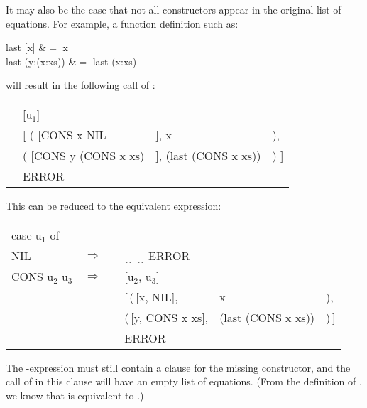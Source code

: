 It may also be the case that not all constructors appear in the original list of equations. For example, a function definition such as:
\begin{letalign}
        last [x] &$=$ x \\
        last (y:(x:xs)) &$=$ last (x:xs)
\end{letalign}
will result in the following call of :
\begin{mlcoded}
    \setlength{\tabcolsep}{0.25em}
    \begin{tabular}{llll}
        \metafn{match} &[u$_1$]  && \\
        &[ ( [CONS x NIL&], x &), \\
        &\phantom{[ }( [CONS y (CONS x xs)&], (last (CONS x xs)) &) ] \\
        &ERROR
    \end{tabular}
\end{mlcoded}
This can be reduced to the equivalent expression:
\begin{mlcoded}
    \setlength{\tabcolsep}{0.25em}
    \begin{tabular}{llllll}
        case u$_1$ of &&&&& \\
        \quad NIL &$\Rightarrow$ &\metafn{match} &[\,] [\,] ERROR && \\
        \quad CONS\! u$_2$\! u$_3$ &$\Rightarrow$ &\metafn{match} &[u$_2$, u$_3$] &&\\
        &&&[\,(\,[x, NIL], &x &), \\
        &&&\phantom{[\,}(\,[y, CONS x xs], &(last (CONS x xs)) &)\,] \\
        &&&ERROR
    \end{tabular}
\end{mlcoded}
The -expression must still contain a clause for the missing constructor, and the call of  in this clause will have an empty list of equations. (From the definition of , we know that  is equivalent to .)

